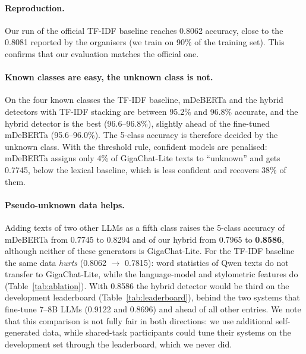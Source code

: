 \documentclass{article}
\begin{document}
\begin{table}[tbh!]
\begin{center}
\small

\caption{5-class results on the AINL-Eval development set (10{,}978 texts). ``+ pseudo-unknown'': trained with our generations of Qwen2.5-3B and Qwen3-4B as a fifth class; otherwise the official threshold rule (max probability $<0.6$ $\Rightarrow$ unknown) is used. Best values in bold.}
\label{tab:main}
\end{center}
\end{table}

\paragraph{Reproduction.} Our run of the official TF-IDF baseline reaches 0.8062 accuracy, close to the 0.8081 reported by the organisers (we train on 90\% of the training set). This confirms that our evaluation matches the official one.

\paragraph{Known classes are easy, the unknown class is not.} On the four known classes the TF-IDF baseline, mDeBERTa and the hybrid detectors with TF-IDF stacking are between 95.2\% and 96.8\% accurate, and the hybrid detector is the best (96.6--96.8\%), slightly ahead of the fine-tuned mDeBERTa (95.6--96.0\%). The 5-class accuracy is therefore decided by the unknown class. With the threshold rule, confident models are penalised: mDeBERTa assigns only 4\% of GigaChat-Lite texts to ``unknown'' and gets 0.7745, below the lexical baseline, which is less confident and recovers 38\% of them.

\paragraph{Pseudo-unknown data helps.} Adding texts of two other LLMs as a fifth class raises the 5-class accuracy of mDeBERTa from 0.7745 to 0.8294 and of our hybrid from 0.7965 to \textbf{0.8586}, although neither of these generators is GigaChat-Lite. For the TF-IDF baseline the same data \emph{hurts} (0.8062 $\to$ 0.7815): word statistics of Qwen texts do not transfer to GigaChat-Lite, while the language-model and stylometric features do (Table~\ref{tab:ablation}). With 0.8586 the hybrid detector would be third on the development leaderboard (Table~\ref{tab:leaderboard}), behind the two systems that fine-tune 7--8B LLMs (0.9122 and 0.8696) and ahead of all other entries. We note that this comparison is not fully fair in both directions: we use additional self-generated data, while shared-task participants could tune their systems on the development set through the leaderboard, which we never did.
\end{document}
